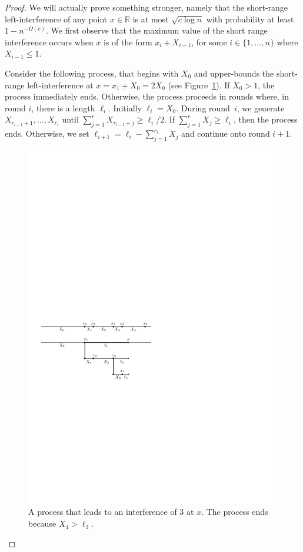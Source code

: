 \documentclass{patmorin}
\begin{document}
\begin{proof}
We will actually prove something stronger, namely that the short-range
left-interference of any point $x \in \mathbb{R}$ is at most $\sqrt{c\log n}$
with probability at least $1-n^{-\Omega(c)}$.  We first observe that the
maximum value of the short range interference occurs when $x$ is of the
form $x_{i} + X_{i-1}$, for some $i\in\{1,\ldots,n\}$ where $X_{i-1}
\le 1$.

Consider the following process, that begins with $X_0$ and
upper-bounds the short-range left-interference at $x=x_1+X_0=2X_0$
(see Figure~\ref{fig:upper-bound}). If $X_0>1$, the process immediately ends.
Otherwise, the process proceeds in rounds where, in round $i$, there
is a length $\ell_i$.  Initially $\ell_i=X_0$.  During round~$i$, we
generate $X_{r_{i-1}+1},\ldots,X_{r_i}$ until $\sum_{j=1}^r X_{r_{i-1}+j}
\ge \ell_i/2$.  If $\sum_{j=1}^r X_j \ge \ell_i$, then the process ends.
Otherwise, we set $\ell_{i+1} = \ell_i-\sum_{j=1}^{r_i} X_j$ and continue
onto round $i+1$.

\begin{figure}
  \begin{center}
  \includegraphics{FIG/upper-bound}
  \end{center}
  \caption{A process that leads to an interference of 3 at $x$.  The process ends because $X_4 > \ell_3$.}
  \label{fig:upper-bound}
\end{figure}


\end{proof}
\end{document}
